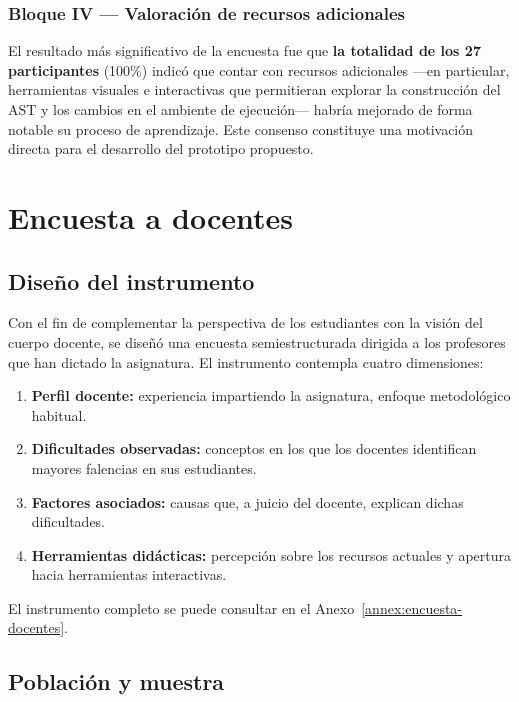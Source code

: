 \subsubsection{Bloque IV — Valoración de recursos adicionales}

El resultado más significativo de la encuesta fue que \textbf{la totalidad de los 27 participantes} (100\%) indicó que contar con recursos adicionales —en particular, herramientas visuales e interactivas que permitieran explorar la construcción del AST y los cambios en el ambiente de ejecución— habría mejorado de forma notable su proceso de aprendizaje. Este consenso constituye una motivación directa para el desarrollo del prototipo propuesto.

\section{Encuesta a docentes}

\subsection{Diseño del instrumento}

Con el fin de complementar la perspectiva de los estudiantes con la visión del cuerpo docente, se diseñó una encuesta semiestructurada dirigida a los profesores que han dictado la asignatura. El instrumento contempla cuatro dimensiones:

\begin{enumerate}
    \item \textbf{Perfil docente:} experiencia impartiendo la asignatura, enfoque metodológico habitual.
    \item \textbf{Dificultades observadas:} conceptos en los que los docentes identifican mayores falencias en sus estudiantes.
    \item \textbf{Factores asociados:} causas que, a juicio del docente, explican dichas dificultades.
    \item \textbf{Herramientas didácticas:} percepción sobre los recursos actuales y apertura hacia herramientas interactivas.
\end{enumerate}

El instrumento completo se puede consultar en el Anexo~\ref{annex:encuesta-docentes}.

\subsection{Población y muestra}

